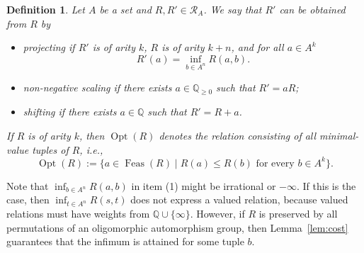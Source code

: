 \documentclass[nonacm]{acmart}
\DeclareMathOperator{\VCSP}{VCSP}
\DeclareMathOperator{\Opt}{Opt}
\DeclareMathOperator{\Feas}{Feas}
\newtheorem{definition}[theorem]{Definition}
\newcommand{\blue}[1]{\textcolor{blue}{#1}}
\begin{document}


\begin{definition}
Let $A$ be a set and $R,R' \in {\mathscr R}_A$.
We say that $R'$ can be obtained from $R$ by 
\begin{itemize}
\item \emph{projecting} if $R'$ is of arity $k$, $R$ is of arity $k+n$, and for all $a \in A^k$ 
\[R'(a) = \inf_{b \in A^n} R(a,b).\]
\item \emph{non-negative scaling} 
 if there exists $a \in {\mathbb Q}_{\geq 0}$ such that $R' = a R$;
 \item  \emph{shifting} if there exists $a \in {\mathbb Q}$ such that $R' = R + a$. 
\end{itemize}
If $R$ is of arity $k$, then $\Opt(R)$ denotes the relation consisting of all minimal-value tuples of $R$, i.e.,
\[\Opt(R) := \{a \in \Feas(R) \mid R(a) \leq R(b) \text{ for every } b \in A^k\}.\]
\end{definition}

Note that $\inf_{b \in A^n} R(a,b)$ in item (1) might be irrational or $-\infty$. If this is the
case, then $\inf_{t \in A^n} R(s,t)$ does not express a valued relation, 
because valued relations must have weights from ${\mathbb Q} \cup \{\infty\}$.
However, if $R$ is preserved by all permutations of
an oligomorphic automorphism group, then Lemma~\ref{lem:cost}  guarantees
that the infimum is attained for some tuple $b$.

\end{document}
